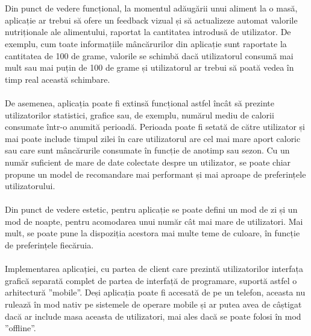 \\ \\
Din punct de vedere funcțional, la momentul adăugării unui aliment la o masă, aplicație ar trebui să ofere un feedback vizual și să actualizeze automat valorile nutriționale ale alimentului, raportat la cantitatea introdusă de utilizator. De exemplu, cum toate informațiile mâncărurilor din aplicație sunt raportate la cantitatea de 100 de grame, valorile se schimbă dacă utilizatorul consumă mai mult sau mai puțin de 100 de grame și utilizatorul ar trebui să poată vedea în timp real această schimbare.
\\ \\
De asemenea, aplicația poate fi extinsă funcțional astfel încât să prezinte utilizatorilor statistici, grafice sau, de exemplu, numărul mediu de calorii consumate într-o anumită perioadă. Perioada poate fi setată de către utilizator și mai poate include timpul zilei în care utilizatorul are cel mai mare aport caloric sau care sunt mâncărurile consumate în funcție de anotimp sau sezon. Cu un număr suficient de mare de date colectate despre un utilizator, se poate chiar propune un model de recomandare mai performant și mai aproape de preferințele utilizatorului.
\\ \\
Din punct de vedere estetic, pentru aplicație se poate defini un mod de zi și un mod de noapte, pentru acomodarea unui număr cât mai mare de utilizatori. Mai mult, se poate pune la dispoziția acestora mai multe teme de culoare, în funcție de preferințele fiecăruia.
\\ \\
Implementarea aplicației, cu partea de client care prezintă utilizatorilor interfața grafică separată complet de partea de interfață de programare, suportă astfel o arhitectură ”mobile”. Deși aplicația poate fi accesată de pe un telefon, aceasta nu rulează în mod nativ pe sistemele de operare mobile și ar putea avea de câștigat dacă ar include masa aceasta de utilizatori, mai ales dacă se poate folosi în mod ”offline”.